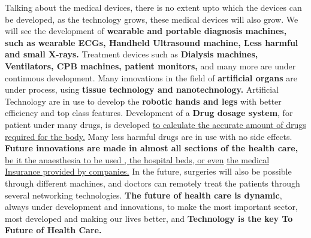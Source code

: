 \documentclass[18pt]{article}
\begin{document}
\newline Talking about the medical devices, there is no extent upto which the devices can be developed, as the technology grows, these medical devices will also grow.
We will see the development of \textbf{wearable and portable diagnosis machines, such as wearable ECGs, Handheld Ultrasound machine, Less harmful and small X-rays.}
Treatment devices such as \textbf{Dialysis machines, Ventilators, CPB machines, patient monitors,} and many more are under continuous development. 
Many innovations in the field of \textbf{artificial organs} are under process, using \textbf{tissue technology and nanotechnology.} Artificial Technology are in use to develop the \textbf{robotic hands and legs} with better efficiency and top class features.
\newline Development of a \textbf{Drug dosage system}, for patient under many drugs, is developed \underline{to calculate the accurate amount of drugs required for the body.}
Many less harmful drugs are in use with no side effects. 
\newline \textbf{Future innovations are made in almost all sections of the health care,} \underline{be it the anaesthesia to be used , the hospital beds, or even} \newline \underline{ the medical Insurance provided by companies.}
\newline In the future, surgeries will also be possible through different machines, and doctors can remotely treat the patients through several networking technologies.
\newline \textbf{The future of health care is dynamic}, always under development and innovations, to make the most important sector, most developed and making our lives better, and \textbf{Technology is the key To Future of Health Care.}
\end{document}
